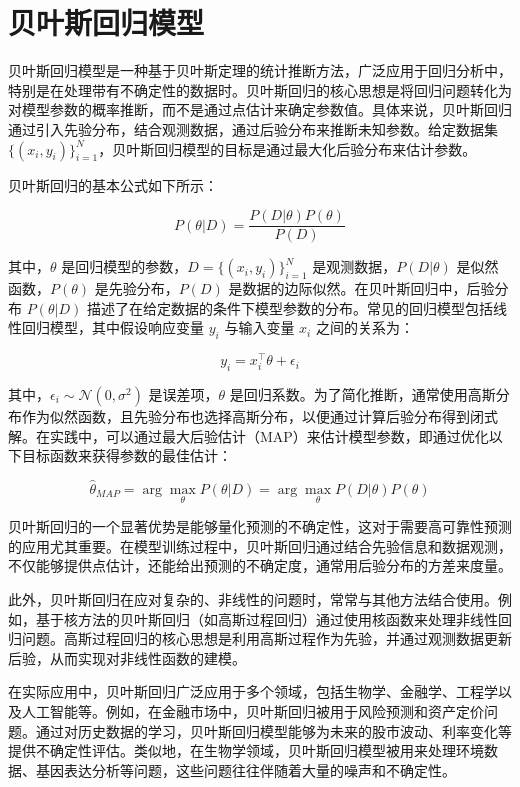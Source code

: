 \documentclass[AutoFakeBold]{LZUThesis-PgD&PhD}
\begin{document}
	\section{贝叶斯回归模型}
	贝叶斯回归模型是一种基于贝叶斯定理的统计推断方法，广泛应用于回归分析中，特别是在处理带有不确定性的数据时。贝叶斯回归的核心思想是将回归问题转化为对模型参数的概率推断，而不是通过点估计来确定参数值。具体来说，贝叶斯回归通过引入先验分布，结合观测数据，通过后验分布来推断未知参数。给定数据集 $\{(x_i, y_i)\}_{i=1}^N$，贝叶斯回归模型的目标是通过最大化后验分布来估计参数。
	
	贝叶斯回归的基本公式如下所示：
	
	\[
	P(\theta | D) = \frac{P(D | \theta) P(\theta)}{P(D)}
	\]
	
	其中，$\theta$ 是回归模型的参数，$D = \{(x_i, y_i)\}_{i=1}^N$ 是观测数据，$P(D | \theta)$ 是似然函数，$P(\theta)$ 是先验分布，$P(D)$ 是数据的边际似然。在贝叶斯回归中，后验分布 $P(\theta | D)$ 描述了在给定数据的条件下模型参数的分布。常见的回归模型包括线性回归模型，其中假设响应变量 $y_i$ 与输入变量 $x_i$ 之间的关系为：
	
	\[
	y_i = x_i^\top \theta + \epsilon_i
	\]
	
	其中，$\epsilon_i \sim \mathcal{N}(0, \sigma^2)$ 是误差项，$\theta$ 是回归系数。为了简化推断，通常使用高斯分布作为似然函数，且先验分布也选择高斯分布，以便通过计算后验分布得到闭式解。在实践中，可以通过最大后验估计（MAP）来估计模型参数，即通过优化以下目标函数来获得参数的最佳估计：
	
	\[
	\hat{\theta}_{MAP} = \arg\max_\theta P(\theta | D) = \arg\max_\theta P(D | \theta) P(\theta)
	\]
	
	贝叶斯回归的一个显著优势是能够量化预测的不确定性，这对于需要高可靠性预测的应用尤其重要。在模型训练过程中，贝叶斯回归通过结合先验信息和数据观测，不仅能够提供点估计，还能给出预测的不确定度，通常用后验分布的方差来度量。
	
	此外，贝叶斯回归在应对复杂的、非线性的问题时，常常与其他方法结合使用。例如，基于核方法的贝叶斯回归（如高斯过程回归）通过使用核函数来处理非线性回归问题。高斯过程回归的核心思想是利用高斯过程作为先验，并通过观测数据更新后验，从而实现对非线性函数的建模。
	
	在实际应用中，贝叶斯回归广泛应用于多个领域，包括生物学、金融学、工程学以及人工智能等。例如，在金融市场中，贝叶斯回归被用于风险预测和资产定价问题。通过对历史数据的学习，贝叶斯回归模型能够为未来的股市波动、利率变化等提供不确定性评估。类似地，在生物学领域，贝叶斯回归模型被用来处理环境数据、基因表达分析等问题，这些问题往往伴随着大量的噪声和不确定性。
	
\end{document}
